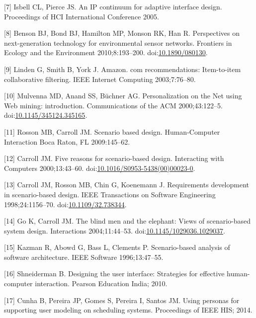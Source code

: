 \documentclass[]{article}
\begin{document}
\hypertarget{ref-Anonymous:VabnjUVa}{}
{[}7{]} Isbell CL, Pierce JS. An IP continuum for adaptive interface
design. Proceedings of HCI International Conference 2005.

\hypertarget{ref-Benson:2010jn}{}
{[}8{]} Benson BJ, Bond BJ, Hamilton MP, Monson RK, Han R. Perspectives
on next-generation technology for environmental sensor networks.
Frontiers in Ecology and the Environment 2010;8:193--200.
doi:\href{https://doi.org/10.1890/080130}{10.1890/080130}.

\hypertarget{ref-linden2003amazon}{}
{[}9{]} Linden G, Smith B, York J. Amazon. com recommendations:
Item-to-item collaborative filtering. IEEE Internet Computing
2003;7:76--80.

\hypertarget{ref-Mulvenna:2000iv}{}
{[}10{]} Mulvenna MD, Anand SS, Büchner AG. Personalization on the Net
using Web mining: introduction. Communications of the ACM
2000;43:122--5.
doi:\href{https://doi.org/10.1145/345124.345165}{10.1145/345124.345165}.

\hypertarget{ref-rosson2009scenario}{}
{[}11{]} Rosson MB, Carroll JM. Scenario based design. Human-Computer
Interaction Boca Raton, FL 2009:145--62.

\hypertarget{ref-Carroll:1999hh}{}
{[}12{]} Carroll JM. Five reasons for scenario-based design. Interacting
with Computers 2000;13:43--60.
doi:\href{https://doi.org/10.1016/S0953-5438(00)00023-0}{10.1016/S0953-5438(00)00023-0}.

\hypertarget{ref-Anonymous:MZBQUkQZ}{}
{[}13{]} Carroll JM, Rosson MB, Chin G, Koenemann J. Requirements
development in scenario-based design. IEEE Transactions on Software
Engineering 1998;24:1156--70.
doi:\href{https://doi.org/10.1109/32.738344}{10.1109/32.738344}.

\hypertarget{ref-mcdonaldm:2004us}{}
{[}14{]} Go K, Carroll JM. The blind men and the elephant: Views of
scenario-based system design. Interactions 2004;11:44--53.
doi:\href{https://doi.org/10.1145/1029036.1029037}{10.1145/1029036.1029037}.

\hypertarget{ref-Anonymous:P3P38N9F}{}
{[}15{]} Kazman R, Abowd G, Bass L, Clements P. Scenario-based analysis
of software architecture. IEEE Software 1996;13:47--55.

\hypertarget{ref-shneiderman2010designing}{}
{[}16{]} Shneiderman B. Designing the user interface: Strategies for
effective human-computer interaction. Pearson Education India; 2010.

\hypertarget{ref-Cunha:2014vu}{}
{[}17{]} Cunha B, Pereira JP, Gomes S, Pereira I, Santos JM. Using
personas for supporting user modeling on scheduling systems. Proceedings
of IEEE HIS; 2014.
\end{document}
